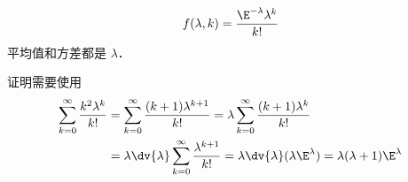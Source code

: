 
\begin{issues}
\issueDraft
\end{issues}

\begin{equation}
f(\lambda, k) = \frac{\E^{-\lambda}\lambda^k}{k!}
\end{equation}
平均值和方差都是 $\lambda$．

证明需要使用
\begin{equation}
\begin{aligned}
\sum_{k=0}^\infty \frac{k^2\lambda^{k}}{k!}
&= \sum_{k=0}^\infty \frac{(k+1)\lambda^{k+1}}{k!}
= \lambda \sum_{k=0}^\infty \frac{(k+1)\lambda^k}{k!}\\
&= \lambda\dv{\lambda} \sum_{k=0}^\infty \frac{\lambda^{k+1}}{k!}
= \lambda \dv{\lambda} (\lambda \E^{\lambda})
= \lambda(\lambda+1)\E^{\lambda}
\end{aligned}
\end{equation}

